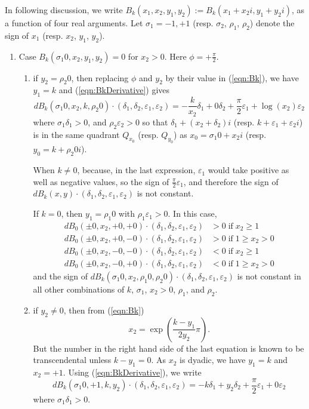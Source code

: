 \documentclass [12pt]{article}
\renewcommand {\epsilon}{\varepsilon}
\renewcommand {\geq}{\geqslant}
\begin{document}
In following discussion, we write
$B_k(x_1, x_2, y_1, y_2) := B_k(x_1+x_2i, y_1+y_2i)$,
as a function of four real arguments.
Let $\sigma_1 = -1,+1$ (resp. $\sigma_2$, $\rho_1$, $\rho_2$) denote the sign
of $x_1$ (resp. $x_2$, $y_1$, $y_2$).
\begin {enumerate}
\item Case $B_k(\sigma_1 0, x_2, y_1, y_2)=0$ for $x_2 > 0$.
  Here $\phi = +\frac{\pi}{2}$.
  \begin {enumerate}
  \item if $y_2=\rho_2 0$, then replacing $\phi$ and $y_2$ by their value in
    (\ref{eqn:Bk}), we have $y_1= k$ and (\ref{eqn:BkDerivative}) gives
    \[
    dB_k(\sigma_1 0, x_2, k, \rho_2 0)\cdot(\delta_1, \delta_2, \epsilon_1,
    \epsilon_2) = - \frac{k}{x_2} \delta_1 + 0 \delta_2 + \frac{\pi}{2}
    \epsilon_1 + \log(x_2) \epsilon_2
    \]
    where $\sigma_1 \delta_1 > 0$, and $\rho_2 \epsilon_2 > 0$ so that
    $\delta_1 + (x_2 + \delta_2)i$ (resp. $k+\epsilon_1 + \epsilon_2 i$) is in
    the same quadrant $Q_{x_0}$ (resp.  $Q_{y_0}$) as $x_0=\sigma_1 0 +x_2 i$
    (resp. $y_0=k +\rho_2 0i$).

    When $k \neq 0$, because, in the last expression,
    $\epsilon_1$ would take positive as well as negative values,
    so the sign of $\frac{\pi}{2} \epsilon_1$, and therefore the sign of
    $dB_k(x, y)\cdot (\delta_1, \delta_2, \epsilon_1, \epsilon_2)$ is not
    constant.

    If $k=0$, then $y_1=\rho_1 0$ with $\rho_1 \epsilon_1 > 0$.
    In this case,
    \begin {align*}
      dB_0(\pm 0, x_2, +0, +0)\cdot(\delta_1, \delta_2, \epsilon_1,
      \epsilon_2) &> 0 \;\text{if}\; x_2 \geq 1 \\
      dB_0(\pm 0, x_2, +0, -0)\cdot(\delta_1, \delta_2, \epsilon_1,
      \epsilon_2) &> 0 \;\text{if}\; 1 \geq x_2 > 0 \\
      dB_0(\pm 0, x_2, -0, -0)\cdot(\delta_1, \delta_2, \epsilon_1,
      \epsilon_2) &< 0 \;\text{if}\;  x_2 \geq 1 \\
      dB_0(\pm 0, x_2, -0, +0)\cdot(\delta_1, \delta_2, \epsilon_1,
      \epsilon_2) &< 0 \;\text{if}\; 1 \geq x_2 > 0
    \end {align*}
    and the sign of $dB_k(\sigma_1 0, x_2, \rho_1 0, \rho_2 0)\cdot(\delta_1,
    \delta_2, \epsilon_1, \epsilon_2)$ is not constant in all other
    combinations of $k$, $\sigma_1$, $x_2>0$, $\rho_1$, and $\rho_2$.

  \item if $y_2\neq 0$, then from (\ref{eqn:Bk})
    \[
    x_2 = \exp\left(\frac{k-y_1}{2y_2}\pi\right).
    \]
    But the number in the right hand side of the last equation is
    known to be transcendental unless $k-y_1=0$.
    As $x_2$ is dyadic, we have $y_1= k$ and $x_2=+1$.
    Using (\ref{eqn:BkDerivative}), we write
    \[
    dB_k(\sigma_1 0, +1, k, y_2)\cdot(\delta_1, \delta_2, \epsilon_1,
    \epsilon_2) = - k \delta_1 + y_2 \delta_2 + \frac{\pi}{2} \epsilon_1 + 0
    \epsilon_2
    \]
    where $\sigma_1 \delta_1 > 0$.


\end{enumerate}
\end{enumerate}
\end{document}

